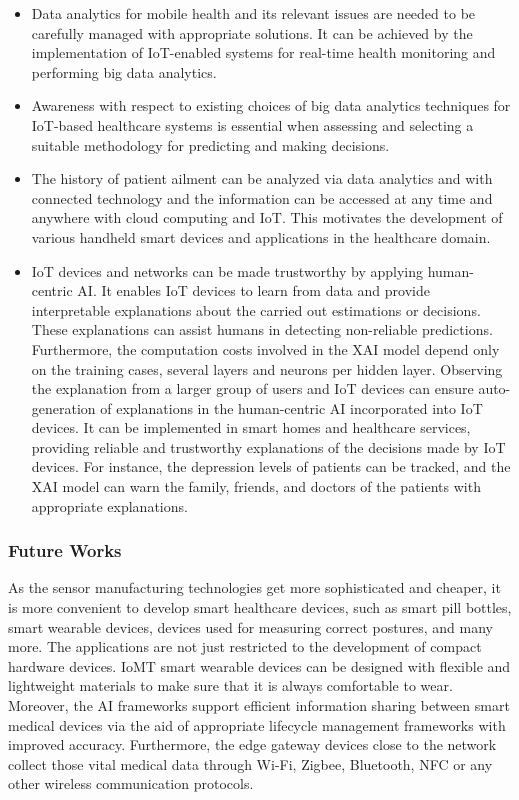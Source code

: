 \documentclass[journal]{IEEEtran}
\begin{document}
\begin{itemize}
    \item Data analytics for mobile health and its relevant issues are needed to be carefully managed with appropriate solutions. It can be achieved by the implementation of IoT-enabled systems for real-time health monitoring and performing big data analytics.
    \item  Awareness with respect to existing choices of big data analytics techniques for IoT-based healthcare systems is essential when assessing and selecting a suitable methodology for predicting and making decisions.
    \item The history of patient ailment can be analyzed via data analytics and with connected technology and the information can be accessed at any time and anywhere with cloud computing and IoT. This motivates the development of various handheld smart devices and applications in the healthcare domain. 
    \item IoT devices and networks can be made trustworthy by applying human-centric AI. It enables IoT devices to learn from data and provide interpretable explanations about the carried out estimations or decisions. These explanations can assist humans in detecting non-reliable predictions. Furthermore, the computation costs involved in the XAI model depend only on the training cases, several layers and neurons per hidden layer. Observing the explanation from a larger group of users and IoT devices can ensure auto-generation of explanations in the human-centric AI incorporated into IoT devices. It can be implemented in smart homes and healthcare services, providing reliable and trustworthy explanations of the decisions made by IoT devices. For instance, the depression levels of patients can be tracked, and the XAI model can warn the family, friends, and doctors of the patients with appropriate explanations.
\end{itemize}

\subsubsection{Future Works}
As the sensor manufacturing technologies get more sophisticated and cheaper, it is more convenient to develop smart healthcare devices, such as smart pill bottles, smart wearable devices, devices used for measuring correct postures, and many more. The applications are not just restricted to the development of compact hardware devices. IoMT smart wearable devices can be designed with flexible and lightweight materials to make sure that it is always comfortable to wear. Moreover, the AI frameworks support efficient information sharing between smart medical devices via the aid of appropriate lifecycle management frameworks with improved accuracy. Furthermore, the edge gateway devices close to the network collect those vital medical data through Wi-Fi, Zigbee, Bluetooth, NFC or any other wireless communication protocols. 
\end{document}
